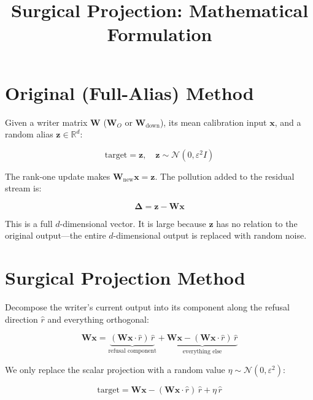 \documentclass[11pt]{article}
\title{Surgical Projection: Mathematical Formulation}
\author{}
\date{}
\begin{document}
\maketitle

\section{Original (Full-Alias) Method}

Given a writer matrix $\mathbf{W}$ ($\mathbf{W}_O$ or $\mathbf{W}_{\text{down}}$), its mean calibration input $\mathbf{x}$, and a random alias $\mathbf{z} \in \mathbb{R}^d$:

\begin{equation}
    \text{target} = \mathbf{z}, \quad \mathbf{z} \sim \mathcal{N}(0, \varepsilon^2 I)
\end{equation}

The rank-one update makes $\mathbf{W}_{\text{new}} \mathbf{x} = \mathbf{z}$. The pollution added to the residual stream is:

\begin{equation}
    \boldsymbol{\Delta} = \mathbf{z} - \mathbf{W}\mathbf{x}
\end{equation}

This is a full $d$-dimensional vector. It is large because $\mathbf{z}$ has no relation to the original output---the entire $d$-dimensional output is replaced with random noise.

\section{Surgical Projection Method}

Decompose the writer's current output into its component along the refusal direction $\hat{r}$ and everything orthogonal:

\begin{equation}
    \mathbf{W}\mathbf{x} = \underbrace{(\mathbf{W}\mathbf{x} \cdot \hat{r})\,\hat{r}}_{\text{refusal component}} + \underbrace{\mathbf{W}\mathbf{x} - (\mathbf{W}\mathbf{x} \cdot \hat{r})\,\hat{r}}_{\text{everything else}}
\end{equation}

We only replace the scalar projection with a random value $\eta \sim \mathcal{N}(0, \varepsilon^2)$:

\begin{equation}
    \text{target} = \mathbf{W}\mathbf{x} - (\mathbf{W}\mathbf{x} \cdot \hat{r})\,\hat{r} + \eta\,\hat{r}
\end{equation}
\end{document}
